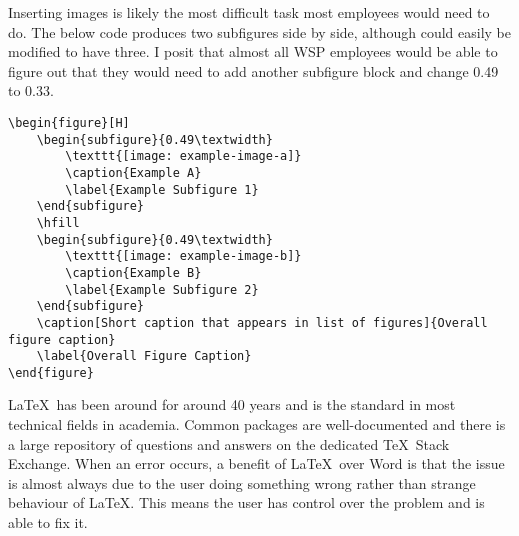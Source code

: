 Inserting images is likely the most difficult task most employees would need to do. The below code produces two subfigures side by side, although could easily be modified to have three. I posit that almost all WSP employees would be able to figure out that they would need to add another subfigure block and change 0.49 to 0.33.

\begin{Verbatim}
\begin{figure}[H]
	\begin{subfigure}{0.49\textwidth}
		\texttt{[image: example-image-a]}
		\caption{Example A}
		\label{Example Subfigure 1}
	\end{subfigure}
	\hfill
	\begin{subfigure}{0.49\textwidth}
		\texttt{[image: example-image-b]}
		\caption{Example B}
		\label{Example Subfigure 2}
	\end{subfigure}
	\caption[Short caption that appears in list of figures]{Overall figure caption}
	\label{Overall Figure Caption}
\end{figure}
\end{Verbatim}

\LaTeX\ has been around for around 40 years and is the standard in most technical fields in academia. Common packages are well-documented and there is a large repository of questions and answers on the dedicated \TeX\ Stack Exchange. When an error occurs, a benefit of \LaTeX\ over Word is that the issue is almost always due to the user doing something wrong rather than strange behaviour of \LaTeX. This means the user has control over the problem and is able to fix it.











